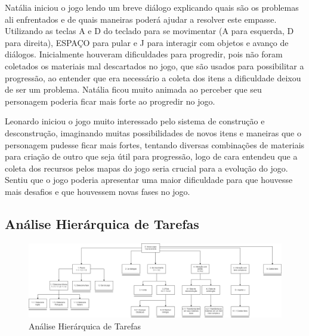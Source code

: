 Natália iniciou o jogo lendo um breve diálogo explicando quais são os problemas ali enfrentados e de quais maneiras poderá ajudar a resolver este empasse. Utilizando as teclas A e D do teclado para se movimentar (A para esquerda, D para direita), ESPAÇO para pular e J para interagir com objetos e avanço de diálogos. Inicialmente houveram dificuldades para progredir, pois não foram coletados os materiais mal descartados no jogo, que são usados para possibilitar a progressão, ao entender que era necessário a coleta dos itens a dificuldade deixou de ser um problema. Natália ficou muito animada ao perceber que seu personagem poderia ficar mais forte ao progredir no jogo.

Leonardo iniciou o jogo muito interessado pelo sistema de construção e desconstrução, imaginando muitas possibilidades de novos itens e maneiras que o personagem pudesse ficar mais fortes, tentando diversas combinações de materiais para criação de outro que seja útil para progressão, logo de cara entendeu que a coleta dos recursos pelos mapas do jogo seria crucial para a evolução do jogo. Sentiu que o jogo poderia apresentar uma maior dificuldade para que houvesse mais desafios e que houvessem novas fases no jogo.

\subsection{Análise Hierárquica de Tarefas}
\begin{figure}[h]
    \centering
    \includegraphics[width=\textwidth]{figuras/analise_tarefas.drawio.png}
    \caption{Análise Hierárquica de Tarefas}
    \label{fig_analise_hierarquica}
\end{figure}

